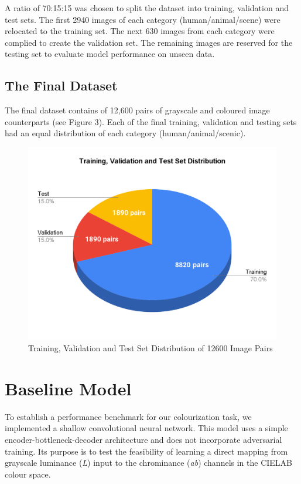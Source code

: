 \documentclass{article} %
\begin{document}
A ratio of 70:15:15 was chosen to split the dataset into training, validation and test sets. The first 2940 images of each category (human/animal/scene) were relocated to the training set. The next 630 images from each category were complied to create the validation set. The remaining images are reserved for the testing set to evaluate model performance on unseen data. 

\subsection{The Final Dataset}

The final dataset contains of 12,600 pairs of grayscale and coloured image counterparts (see Figure 3). Each of the final training, validation and testing sets had an equal distribution of each category (human/animal/scenic). 

\begin{figure}[htbp]            %
  \centering
  \includegraphics[width=0.7\linewidth]{Figs/dataset1.png}
  \caption{Training, Validation and Test Set Distribution of 12600 Image Pairs}
  \label{fig:dataset}
\end{figure}

\section{Baseline Model}

To establish a performance benchmark for our colourization task, we implemented a shallow convolutional neural network. This model uses a simple encoder-bottleneck-decoder architecture and does not incorporate adversarial training. Its purpose is to test the feasibility of learning a direct mapping from grayscale luminance (\textit{L}) input to the chrominance (\textit{ab}) channels in the CIELAB colour space.
\end{document}
